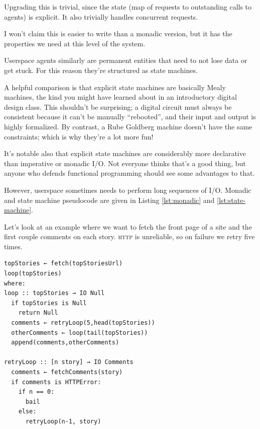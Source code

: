 \documentclass[twoside]{article}
\begin{document}
Upgrading this is trivial, since the state (map of requests to
outstanding calls to agents) is explicit. It also trivially handles
concurrent requests.

I won't claim this is easier to write than a monadic
version, but it has the properties we need at this level of the system.

Userspace agents similarly are permanent entities that need to not lose
data or get stuck. For this reason they're structured as state machines.

A helpful comparison is that explicit state machines are basically Mealy
machines, the kind you might have learned about in an introductory
digital design class. This shouldn't be surprising; a digital circuit
must always be consistent because it can't be manually ``rebooted'', and
their input and output is highly formalized. By contrast, a Rube
Goldberg machine doesn't have the same constraints; which is why they're
a lot more fun!

It's notable also that explicit state machines are considerably more
declarative than imperative or monadic I/O. Not everyone thinks that's a
good thing, but anyone who defends functional programming should see
some advantages to that.

However, userspace sometimes needs to perform long sequences of I/O.
Monadic and state machine pseudocode are given in Listing \ref{lst:monadic} and \ref{lst:state-machine}.

Let's look at an example where we want to fetch the front page of a site
and the first couple comments on each story. \textsc{http} is unreliable, so on
failure we retry five times.

\begin{lstlisting}[style=listingblock,
                   float=b!,
                   label={lst:monadic},
                   caption={Monadic I/O example of fetching top stories and comments.},]
topStories ← fetch(topStoriesUrl)
loop(topStories)
where:
loop :: topStories → IO Null
  if topStories is Null
    return Null
  comments ← retryLoop(5,head(topStories))
  otherComments ← loop(tail(topStories))
  append(comments,otherComments)

retryLoop :: [n story] → IO Comments
  comments ← fetchComments(story)
  if comments is HTTPError:
    if n == 0:
      bail
    else:
      retryLoop(n-1, story)
\end{lstlisting}
\end{document}
